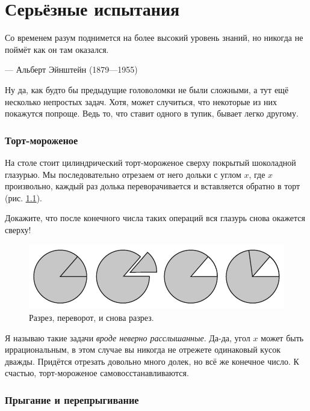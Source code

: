 \chapter{Серьёзные испытания}


\setlength{\epigraphwidth}{.80\textwidth}
\epigraph{Со временем разум поднимется на более высокий уровень знаний, но никогда не поймёт как он там оказался.
}{--- Альберт Эйнштейн (1879---1955)}

Ну да, как будто бы предыдущие головоломки не были сложными, а тут ещё несколько непростых задач.
Хотя, может случиться, что некоторые из них покажутся попроще.
Ведь то, что ставит одного в тупик, бывает легко другому.


\subsection*{Торт-мороженое}\label{Торт-мороженое}

На столе стоит цилиндрический торт-мороженое сверху покрытый шоколадной глазурью.
Мы последовательно отрезаем от него дольки с углом $x$, где $x$ произвольно,
каждый раз долька переворачивается и вставляется обратно в торт
(рис. \ref{pic:tort}).

Докажите, что после конечного числа таких операций вся глазурь снова окажется сверху!


\begin{figure}[htb!]
\centering
\includegraphics[scale=1]{pics/tort}
\caption{Разрез, переворот, и снова разрез.}
\label{pic:tort}
\end{figure}

Я называю такие задачи \emph{вроде неверно расслышанные}.
Да-да, угол $x$ может быть иррациональным, в этом случае вы никогда не отрежете одинаковый кусок дважды.
Придётся отрезать довольно много долек, но всё же конечное число.
К счастью, торт-мороженое самовосстанавливаются.

\subsection*{Прыгание и перепрыгивание}


